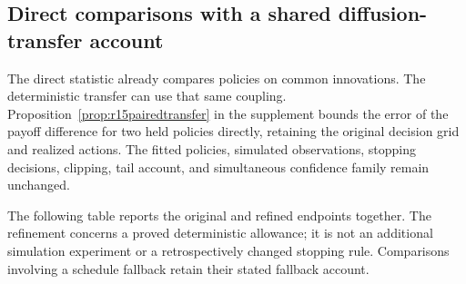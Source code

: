\subsection{Direct comparisons with a shared diffusion-transfer account}
\label{sec:r15pairedcomparison}
The direct statistic already compares policies on common innovations. The
deterministic transfer can use that same coupling. Proposition~\ref{prop:r15pairedtransfer}
in the supplement bounds the error of the payoff difference for two held
policies directly, retaining the original decision grid and realized actions.
The fitted policies, simulated observations, stopping decisions, clipping,
tail account, and simultaneous confidence family remain unchanged.

The following table reports the original and refined endpoints together.
The refinement concerns a proved deterministic allowance; it is not an
additional simulation experiment or a retrospectively changed stopping rule.
Comparisons involving a schedule fallback retain their stated fallback account.
\begingroup\setlength{\tabcolsep}{3pt}

\endgroup

